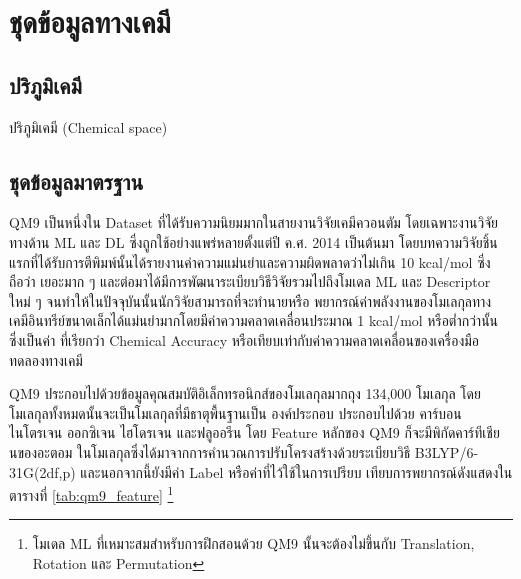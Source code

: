 

\chapter{ชุดข้อมูลทางเคมี}
\label{ch:dataset}

\section{ปริภูมิเคมี}

ปริภูมิเคมี (Chemical space) 

\section{ชุดข้อมูลมาตรฐาน}

QM9 เป็นหนึ่งใน Dataset ที่ได้รับความนิยมมากในสายงานวิจัยเคมีควอนตัม โดยเฉพาะงานวิจัยทางด้าน ML และ DL ซึ่งถูกใช้อย่างแพร่หลายตั้งแต่ปี
ค.ศ. 2014 เป็นต้นมา โดยบทความวิจัยชิ้นแรกที่ได้รับการตีพิมพ์นั้นได้รายงานค่าความแม่นยำและความผิดพลาดว่าไม่เกิน 10 kcal/mol ซึ่งถือว่า%
เยอะมาก ๆ และต่อมาได้มีการพัฒนาระเบียบวิธีวิจัยรวมไปถึงโมเดล ML และ Descriptor ใหม่ ๆ จนทำให้ในปัจจุบันนั้นนักวิจัยสามารถที่จะทำนายหรือ%
พยากรณ์ค่าพลังงานของโมเลกุลทางเคมีอินทรีย์ขนาดเล็กได้แม่นยำมากโดยมีค่าความคลาดเคลื่อนประมาณ 1 kcal/mol หรือต่ำกว่านั้น ซึ่งเป็นค่า%
ที่เรียกว่า Chemical Accuracy หรือเทียบเท่ากับค่าความคลาดเคลื่อนของเครื่องมือทดลองทางเคมี 

QM9 ประกอบไปด้วยข้อมูลคุณสมบัติอิเล็กทรอนิกส์ของโมเลกุลมากถุง 134,000 โมเลกุล โดยโมเลกุลทั้งหมดนั้นจะเป็นโมเลกุลที่มีธาตุพื้นฐานเป็น%
องค์ประกอบ ประกอบไปด้วย คาร์บอน ไนโตรเจน ออกซิเจน ไฮโดรเจน และฟลูออรีน โดย Feature หลักของ QM9 ก็จะมีพิกัดคาร์ทีเชียนของอะตอม%
ในโมเลกุลซึ่งได้มาจากการคำนวณการปรับโครงสร้างด้วยระเบียบวิธี B3LYP/6-31G(2df,p) และนอกจากนี้ยังมีค่า Label หรือค่าที่ไว้ใช้ในการเปรียบ%
เทียบการพยากรณ์ดังแสดงในตารางที่ \ref{tab:qm9_feature}
\footnote{โมเดล ML ที่เหมาะสมสำหรับการฝึกสอนด้วย QM9 นั้นจะต้องไม่ขึ้นกับ Translation, Rotation และ Permutation}


